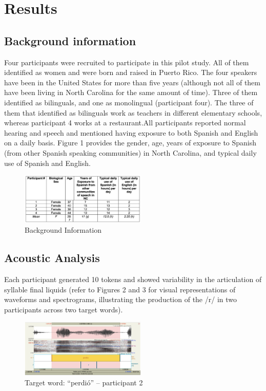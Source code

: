 \documentclass[
  a4paper,
  11pt,
  twocolumn]{article}
\begin{document}
\section{Results}

\subsection{Background information}

Four participants were recruited to participate in this pilot study. All
of them identified as women and were born and raised in Puerto Rico. The
four speakers have been in the United States for more than five years
(although not all of them have been living in North Carolina for the
same amount of time). Three of them identified as bilinguals, and one as
monolingual (participant four). The three of them that identified as
bilinguals work as teachers in different elementary schools, whereas
participant 4 works at a restaurant.All participants reported normal
hearing and speech and mentioned having exposure to both Spanish and
English on a daily basis. Figure 1 provides the gender, age, years of
exposure to Spanish (from other Spanish speaking communities) in North
Carolina, and typical daily use of Spanish and English.

\begin{figure}[!ht]
\begin{center}
\includegraphics[width=6cm]{./includes/figures/background.png}
\caption{Background Information}\label{fig:vowels}
\end{center}
\end{figure}

\subsection{Acoustic Analysis}

Each participant generated 10 tokens and showed variability in the
articulation of syllable final liquids (refer to Figures 2 and 3 for
visual representations of waveforms and spectrograms, illustrating the
production of the /r/ in two participants across two target words).

\begin{figure}[!ht]
\begin{center}
\includegraphics[width=6cm]{./includes/figures/praat.png}
\caption{Target word: “perdió” – participant 2}\label{fig:vowels}
\end{center}
\end{figure}
\end{document}
